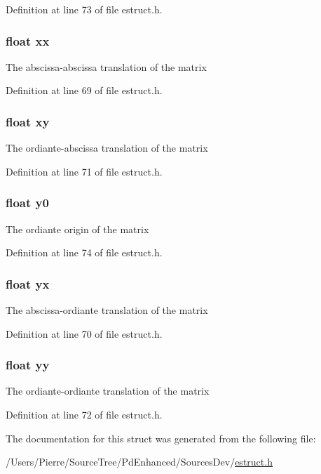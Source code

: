 Definition at line 73 of file estruct.\-h.

\hypertarget{struct__matrix_a9fb9d00fbbf390e0263bcc204b03c7c8}{
\subsubsection[{xx}]{\setlength{\rightskip}{0pt plus 5cm}float xx}}\label{struct__matrix_a9fb9d00fbbf390e0263bcc204b03c7c8}
The abscissa-\/abscissa translation of the matrix 

Definition at line 69 of file estruct.\-h.

\hypertarget{struct__matrix_a83a7590defc35766f789fbbf7fc41590}{
\subsubsection[{xy}]{\setlength{\rightskip}{0pt plus 5cm}float xy}}\label{struct__matrix_a83a7590defc35766f789fbbf7fc41590}
The ordiante-\/abscissa translation of the matrix 

Definition at line 71 of file estruct.\-h.

\hypertarget{struct__matrix_adf19b8ba42d497d3093c3a51b1a32cca}{
\subsubsection[{y0}]{\setlength{\rightskip}{0pt plus 5cm}float y0}}\label{struct__matrix_adf19b8ba42d497d3093c3a51b1a32cca}
The ordiante origin of the matrix 

Definition at line 74 of file estruct.\-h.

\hypertarget{struct__matrix_a8e1608facba0c31efe99d65811fab570}{
\subsubsection[{yx}]{\setlength{\rightskip}{0pt plus 5cm}float yx}}\label{struct__matrix_a8e1608facba0c31efe99d65811fab570}
The abscissa-\/ordiante translation of the matrix 

Definition at line 70 of file estruct.\-h.

\hypertarget{struct__matrix_a342cbf7f29a65a0d1a2949ef4675008e}{
\subsubsection[{yy}]{\setlength{\rightskip}{0pt plus 5cm}float yy}}\label{struct__matrix_a342cbf7f29a65a0d1a2949ef4675008e}
The ordiante-\/ordiante translation of the matrix 

Definition at line 72 of file estruct.\-h.



The documentation for this struct was generated from the following file\-:\begin{DoxyCompactItemize}
\item 
/\-Users/\-Pierre/\-Source\-Tree/\-Pd\-Enhanced/\-Sources\-Dev/\hyperlink{estruct_8h}{estruct.\-h}\end{DoxyCompactItemize}
